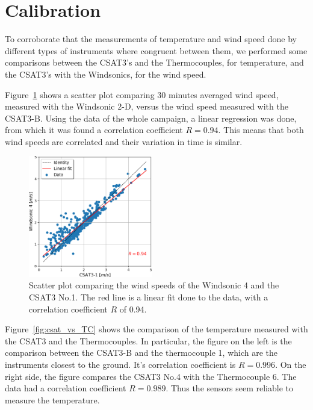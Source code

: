 \section{Calibration}

To corroborate that the measurements of temperature and wind speed done by different types of instruments where congruent between them, we performed some comparisons between the CSAT3's and the Thermocouples, for temperature, and the CSAT3's with the Windsonics, for the wind speed.

Figure~\ref{fig:csat1_vs_ws3} shows a scatter plot comparing 30 minutes averaged wind speed, measured with the Windsonic 2-D, versus the wind speed measured with the CSAT3-B. Using the data of the whole campaign, a linear regression was done, from which it was found a correlation coefficient $R = 0.94$. This means that both wind speeds are correlated and their variation in time is similar. 

\begin{figure}[!ht]
    \centering
    \includegraphics[width=0.48\textwidth]{fig/chapter_4/gunshot_csat1_vs_ws3.png}
    \caption{Scatter plot comparing the wind speeds of the Windsonic 4 and the CSAT3 No.1. The red line is a linear fit done to the data, with a correlation coefficient $R$ of 0.94.}
    \label{fig:csat1_vs_ws3}
\end{figure}

Figure~\ref{fig:csat_vs_TC} shows the comparison of the temperature measured with the CSAT3 and the Thermocouples. In particular, the figure on the left is the comparison between the CSAT3-B and the thermocouple 1, which are the instruments closest to the ground. It's correlation coefficient is $R = 0.996$. On the right side, the figure compares the CSAT3 No.4 with the Thermocouple 6. The data had a correlation coefficient $R = 0.989$. Thus the sensors seem reliable to measure the temperature.

